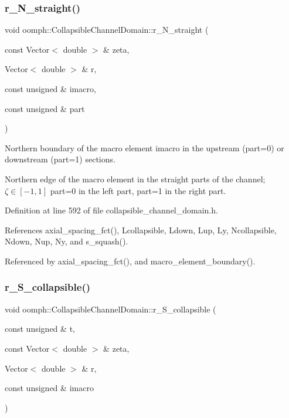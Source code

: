 \subsubsection{\texorpdfstring{r\+\_\+\+N\+\_\+straight()}{r\_N\_straight()}}
{\footnotesize\ttfamily void oomph\+::\+Collapsible\+Channel\+Domain\+::r\+\_\+\+N\+\_\+straight (\begin{DoxyParamCaption}\item[{const Vector$<$ double $>$ \&}]{zeta,  }\item[{Vector$<$ double $>$ \&}]{r,  }\item[{const unsigned \&}]{imacro,  }\item[{const unsigned \&}]{part }\end{DoxyParamCaption})\hspace{0.3cm}{\ttfamily [private]}}



Northern boundary of the macro element imacro in the upstream (part=0) or downstream (part=1) sections. 

Northern edge of the macro element in the straight parts of the channel; $ \zeta \in [-1,1] $ part=0 in the left part, part=1 in the right part. 

Definition at line 592 of file collapsible\+\_\+channel\+\_\+domain.\+h.



References axial\+\_\+spacing\+\_\+fct(), Lcollapsible, Ldown, Lup, Ly, Ncollapsible, Ndown, Nup, Ny, and s\+\_\+squash().



Referenced by axial\+\_\+spacing\+\_\+fct(), and macro\+\_\+element\+\_\+boundary().

\mbox{\label{classoomph_1_1CollapsibleChannelDomain_a1cc35b555f16401ec12854ff5a486800}} 
\subsubsection{\texorpdfstring{r\+\_\+\+S\+\_\+collapsible()}{r\_S\_collapsible()}}
{\footnotesize\ttfamily void oomph\+::\+Collapsible\+Channel\+Domain\+::r\+\_\+\+S\+\_\+collapsible (\begin{DoxyParamCaption}\item[{const unsigned \&}]{t,  }\item[{const Vector$<$ double $>$ \&}]{zeta,  }\item[{Vector$<$ double $>$ \&}]{r,  }\item[{const unsigned \&}]{imacro }\end{DoxyParamCaption})\hspace{0.3cm}{\ttfamily [private]}}



